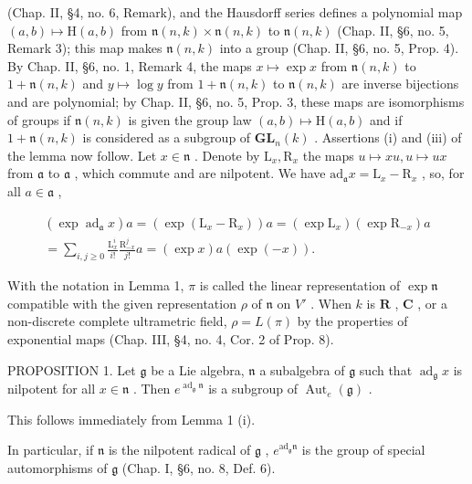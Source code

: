 (Chap. II, §4, no. 6, Remark), and the Hausdorff series defines a polynomial map \((a,b)\mapsto\mathrm{H}(a,b)\) from \(\mathfrak{n}(n,k)\times\mathfrak{n}(n,k)\) to \(\mathfrak{n}(n,k)\) (Chap. II, §6, no. 5, Remark 3); this map makes \(\mathfrak{n}(n,k)\) into a group (Chap. II, §6, no. 5, Prop. 4). By Chap. II, §6, no. 1, Remark 4, the maps \(x\mapsto\exp x\) from \(\mathfrak{n}(n,k)\) to \(1+\mathfrak{n}(n,k)\) and \(y\mapsto\log y\) from \(1+\mathfrak{n}(n,k)\) to \(\mathfrak{n}(n,k)\) are inverse bijections and are polynomial; by Chap. II, §6, no. 5, Prop. 3, these maps are isomorphisms of groups if \(\mathfrak{n}(n,k)\) is given the group law \((a,b)\mapsto\mathrm{H}(a,b)\) and if \(1+\mathfrak{n}(n,k)\) is considered as a subgroup of \(\mathbf{GL}_{n}(k)\) . Assertions (i) and (iii) of the lemma now follow. Let \(x\in\mathfrak{n}\) . Denote by \(\mathrm{L}_{x},\mathrm{R}_{x}\) the maps \(u\mapsto xu,u\mapsto ux\) from \(\mathfrak{a}\) to \(\mathfrak{a}\) , which commute and are nilpotent. We have \(\mathrm{ad}_{\mathfrak{a}}x=\mathrm{L}_{x}-\mathrm{R}_{x}\) , so, for all \(a\in\mathfrak{a}\) ,

\[
\begin{array}{c} (\exp \operatorname{ad} _ {\mathfrak {a}} x) a = (\exp (\mathrm{L} _ {x} - \mathrm{R} _ {x})) a = (\exp \mathrm{L} _ {x}) (\exp \mathrm{R} _ {- x}) a \\ = \sum_ {i, j \geq 0} \frac {\mathrm{L} _ {x} ^ {i}}{i !} \frac {\mathrm{R} _ {- x} ^ {j}}{j !} a = (\exp x) a (\exp (- x)). \end{array}\tag{1}
\]

With the notation in Lemma 1, \(\pi\) is called the linear representation of \(\exp \mathfrak{n}\) compatible with the given representation \(\rho\) of \(\mathfrak{n}\) on \(V'\) . When \(k\) is \(\mathbf{R}\) , \(\mathbf{C}\) , or a non-discrete complete ultrametric field, \(\rho = L(\pi)\) by the properties of exponential maps (Chap. III, §4, no. 4, Cor. 2 of Prop. 8).

PROPOSITION 1. Let \(\mathfrak{g}\) be a Lie algebra, \(\mathfrak{n}\) a subalgebra of \(\mathfrak{g}\) such that \(\operatorname{ad}_{\mathfrak{g}}x\) is nilpotent for all \(x\in \mathfrak{n}\) . Then \(e^{\operatorname{ad}_{\mathfrak{g}}\mathfrak{n}}\) is a subgroup of \(\operatorname{Aut}_e(\mathfrak{g})\) .

This follows immediately from Lemma 1 (i).

In particular, if \(\mathfrak{n}\) is the nilpotent radical of \(\mathfrak{g}\) , \(e^{\mathrm{ad}_{\mathfrak{g}}\mathfrak{n}}\) is the group of special automorphisms of \(\mathfrak{g}\) (Chap. I, §6, no. 8, Def. 6).

